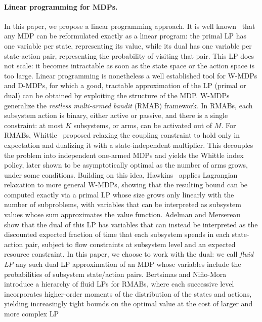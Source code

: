 \documentclass{article}
\begin{document}
\paragraph{Linear programming for MDPs.}
\label{sec:lp-review}
In this paper, we propose a linear programming approach. It is well known~\cite{manne_linear_1960} that any MDP can be reformulated exactly as a
linear program: the primal LP has one variable per state, representing its value, while its dual has one
variable per state-action pair, representing the probability of visiting that pair. This LP does not scale: it
becomes intractable as soon as the state space or the action space is too large. Linear programming is nonetheless
a well established tool for W-MDPs and D-MDPs, for which a good, tractable approximation of the LP (primal or dual)
can be obtained by exploiting the structure of the MDP. W-MDPs generalize the \emph{restless multi-armed bandit} (RMAB) framework. In RMABs, each subsystem action is binary, either active or passive, and there is a single constraint: at most $K$ subsystems, or arms, can be activated out of $M$.
For RMABs, Whittle~\cite{whittle1988} proposed relaxing the coupling constraint to hold only in expectation
and dualizing it with a state-independent multiplier. This decouples the problem into independent one-armed
MDPs and yields the Whittle index policy, later shown to be asymptotically optimal as the number of arms
grows, under some conditions. Building on this idea, Hawkins~\cite{hawkins2003} applies Lagrangian
relaxation to more general W-MDPs, showing that the resulting bound can be computed exactly
via a primal LP whose size grows only linearly with the number of subproblems, with
variables that can be interpreted as subsystem values whose sum approximates the value
function. Adelman and Mersereau~\cite{AdelmanMersereau2008} show that the dual of this LP has variables that can instead be interpreted as
the discounted expected fraction of time that each subsystem spends in each state-action pair, subject to
flow constraints at subsystem level and an expected resource constraint. In this paper, we choose to work with the dual: we call \emph{fluid LP} any such
dual LP approximation of an MDP whose variables include the probabilities of subsystem state/action pairs. Bertsimas and
Niño-Mora~\cite{bertsimasninomora2000} introduce a hierarchy of fluid LPs for RMABs,
where each successive level incorporates higher-order moments of the distribution of the states and actions,
yielding increasingly tight bounds on the optimal value at the cost of larger and more complex LP
\end{document}
